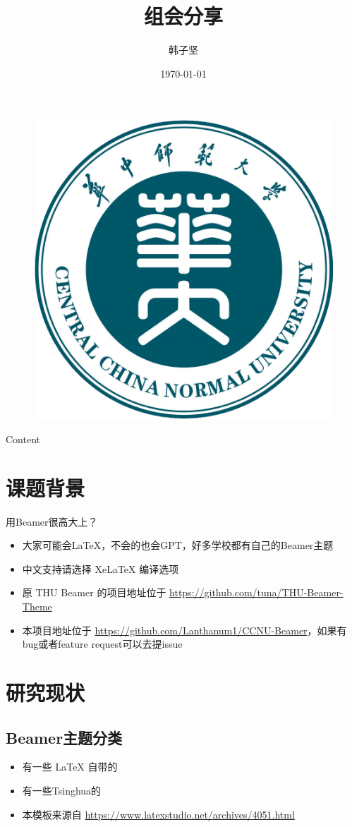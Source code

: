 \documentclass[aspectratio=169]{beamer}
\author{韩子坚}
\title{组会分享}    %
\institute{华中师范大学计算机学院}    %
\date{\today}     %
\begin{document}
\kaishu %

\begin{frame}
	\titlepage
	\begin{figure}[htpb]
		\begin{center}
			\includegraphics[width=0.15\linewidth]{pic/CCNU.jpg}
		\end{center}
	\end{figure}
\end{frame}

\begin{frame}{Content}
	\tableofcontents[sectionstyle=show,subsectionstyle=show/shaded/hide,subsubsectionstyle=show/shaded/hide]
\end{frame}


\section{课题背景}

\begin{frame}{用Beamer很高大上？}
	\begin{itemize}[<+-| alert@+>] %
		\item 大家可能会\LaTeX{}，不会的也会GPT，好多学校都有自己的Beamer主题
		\item 中文支持请选择 Xe\LaTeX{} 编译选项
		\item 原 THU Beamer 的项目地址位于 \url{https://github.com/tuna/THU-Beamer-Theme}
		\item 本项目地址位于 \url{https://github.com/Lanthanum1/CCNU-Beamer}，如果有bug或者feature request可以去提issue
	\end{itemize}
\end{frame}


\section{研究现状}

\subsection{Beamer主题分类}

\begin{frame}
	\begin{itemize}
		\item 有一些 \LaTeX{} 自带的
		\item 有一些Tsinghua的
		\item 本模板来源自 \newline \url{https://www.latexstudio.net/archives/4051.html}
	\end{itemize}
\end{frame}
\end{document}
